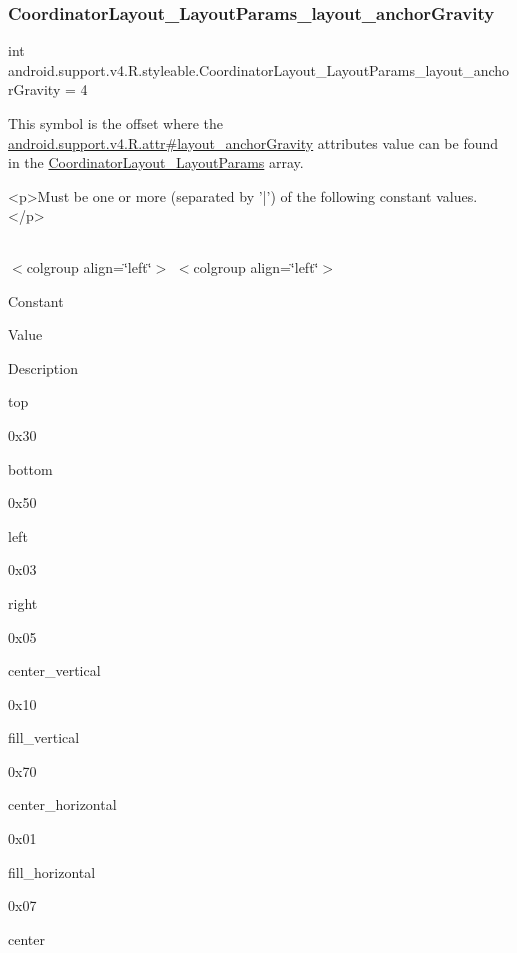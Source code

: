 \subsubsection{\texorpdfstring{Coordinator\+Layout\+\_\+\+Layout\+Params\+\_\+layout\+\_\+anchor\+Gravity}{CoordinatorLayout\_LayoutParams\_layout\_anchorGravity}}
{\footnotesize\ttfamily int android.\+support.\+v4.\+R.\+styleable.\+Coordinator\+Layout\+\_\+\+Layout\+Params\+\_\+layout\+\_\+anchor\+Gravity = 4\hspace{0.3cm}{\ttfamily [static]}}

This symbol is the offset where the \hyperlink{classandroid_1_1support_1_1v4_1_1R_1_1attr_a7b903ff169eccd661e399a2c828c411c}{android.\+support.\+v4.\+R.\+attr\#layout\+\_\+anchor\+Gravity} attribute\textquotesingle{}s value can be found in the \hyperlink{classandroid_1_1support_1_1v4_1_1R_1_1styleable_a9b9df68895be97c43703c5d0a130e2d9}{Coordinator\+Layout\+\_\+\+Layout\+Params} array.

\begin{DoxyVerb}      <p>Must be one or more (separated by '|') of the following constant values.</p>
\end{DoxyVerb}
 \tabulinesep=1mm
\begin{longtabu} spread 0pt [c]{*{0}{|X[-1]}|}
\hline
\end{longtabu}
$<$colgroup align=\char`\"{}left\char`\"{}$>$ $<$colgroup align=\char`\"{}left\char`\"{}$>$ 

Constant

Value

Description 

{\ttfamily top}

0x30

{\ttfamily bottom}

0x50

{\ttfamily left}

0x03

{\ttfamily right}

0x05

{\ttfamily center\+\_\+vertical}

0x10

{\ttfamily fill\+\_\+vertical}

0x70

{\ttfamily center\+\_\+horizontal}

0x01

{\ttfamily fill\+\_\+horizontal}

0x07

{\ttfamily center}

